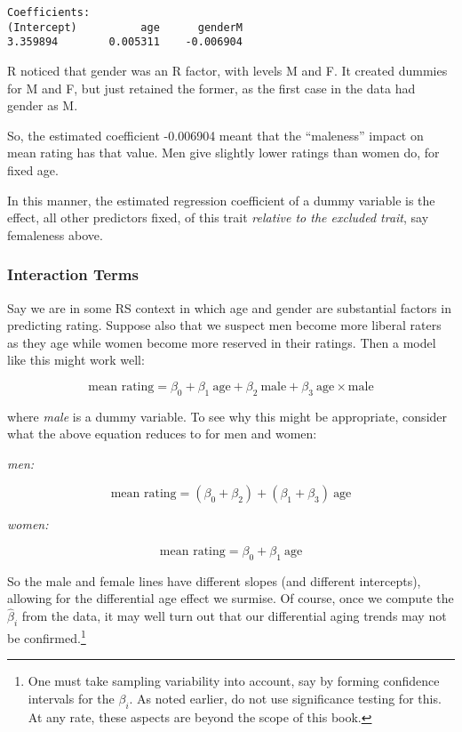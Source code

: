 \begin{lstlisting}
Coefficients:
(Intercept)          age      genderM  
3.359894        0.005311    -0.006904  
\end{lstlisting}

R noticed that gender was an R factor, with levels M and F.  It created
dummies for M and F, but just retained the former, as the first case in
the data had gender as M.

So, the estimated coefficient -0.006904 meant that the ``maleness''
impact on mean rating has that value.  Men give slightly lower
ratings than women do, for fixed age.

In this manner, the estimated regression coefficient of a dummy variable
is the effect, all other predictors fixed, of this trait
\textit{relative to the excluded trait}, say femaleness above.

\subsubsection{Interaction Terms}

Say we are in some RS context in which age and gender are substantial
factors in predicting rating.  Suppose also that we suspect men become
more liberal raters as they age while women become more reserved in
their ratings.  Then a model like this might work well:

\begin{equation}
\label{mfinteraction}
\textrm{mean rating} = \beta_0 + \beta_1 ~ \textrm{age} + 
\beta_2 ~ \textrm{male} +
\beta_3 ~ \textrm{age} \times \textrm{male}
\end{equation}

where \textit{male} is a dummy variable.  To see why this might be
appropriate, consider what the above equation reduces to for men and
women:

\textit{men:}

\begin{equation}
\textrm{mean rating} 
= (\beta_0+\beta_2) + (\beta_1+\beta_3) ~ \textrm{age} 
\end{equation}

\textit{women:}

\begin{equation}
\textrm{mean rating} = \beta_0 + \beta_1 ~ \textrm{age} 
\end{equation}

So the male and female lines have different slopes (and different
intercepts), allowing for the differential age effect we surmise.
Of course, once we compute the $\widehat{\beta}_i$ from the data, it
may well turn out that our differential aging trends may not be
confirmed.\footnote{One must take sampling variability into account, say
by forming confidence intervals for the $\beta_i$.  As noted earlier, do
not use significance testing for this.  At any rate, these aspects are
beyond the scope of this book.}


